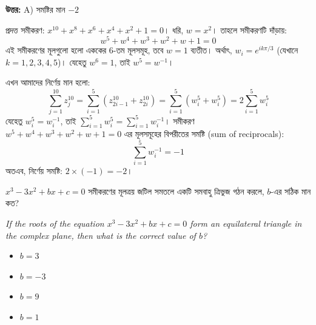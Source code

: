 \documentclass[12pt, a4paper]{article}
\begin{document}
\vspace{0.5em}
\begin{tcolorbox}[answerbox]
    \textbf{\color{success} উত্তর:} A) সমষ্টির মান $-2$
\end{tcolorbox}
\vspace{1em}

\begin{tcolorbox}[solutionbox={সমাধান (Solution)}]
    \noindent
    প্রদত্ত সমীকরণ: $x^{10} + x^8 + x^6 + x^4 + x^2 + 1 = 0$। ধরি, $w = x^2$। তাহলে সমীকরণটি দাঁড়ায়:
    \[ w^5 + w^4 + w^3 + w^2 + w + 1 = 0 \]
    এই সমীকরণের মূলগুলো হলো এককের $6$-তম মূলসমূহ, তবে $w = 1$ ব্যতীত। অর্থাৎ, $w_i = e^{i k \pi/3}$ (যেখানে $k = 1, 2, 3, 4, 5$)। যেহেতু $w^6 = 1$, তাই $w^5 = w^{-1}$।
    
    \vspace{0.5em}
    এখন আমাদের নির্ণেয় মান হলো:
    \[ \sum_{j=1}^{10} z_j^{10} = \sum_{i=1}^5 (z_{2i-1}^{10} + z_{2i}^{10}) = \sum_{i=1}^5 (w_i^5 + w_i^5) = 2 \sum_{i=1}^5 w_i^5 \]
    যেহেতু $w_i^5 = w_i^{-1}$, তাই $\sum_{i=1}^5 w_i^5 = \sum_{i=1}^5 w_i^{-1}$। সমীকরণ $w^5 + w^4 + w^3 + w^2 + w + 1 = 0$ এর মূলসমূহের বিপরীতের সমষ্টি (sum of reciprocals):
    \[ \sum_{i=1}^5 w_i^{-1} = -1 \]
    অতএব, নির্ণেয় সমষ্টি: $2 \times (-1) = -2$।
\end{tcolorbox}
\vspace{1em}

\begin{tcolorbox}[questionbox={প্রশ্ন (Question) 46}]
    \noindent
    $x^3 - 3x^2 + bx + c = 0$ সমীকরণের মূলত্রয় জটিল সমতলে একটি সমবাহু ত্রিভুজ গঠন করলে, $b$-এর সঠিক মান কত?
    
    \vspace{0.8em}
    \begin{english}
    \noindent\textit{\color{darkgray}
    If the roots of the equation $x^3 - 3x^2 + bx + c = 0$ form an equilateral triangle in the complex plane, then what is the correct value of $b$?
    }
    \end{english}
\end{tcolorbox}

\begin{itemize}[label={}, leftmargin=1cm, itemsep=0.5em]
    \item[\textbf{A)}] $b = 3$
    \item[\textbf{B)}] $b = -3$
    \item[\textbf{C)}] $b = 9$
    \item[\textbf{D)}] $b = 1$
\end{itemize}
\end{document}
